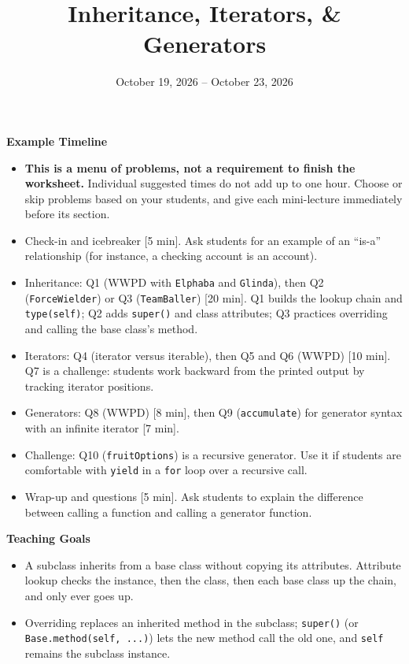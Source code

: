 \documentclass{exam}
\title{Inheritance, Iterators, \& Generators}
\date{October 19, 2026 -- October 23, 2026}
\begin{document}
\maketitle

\begin{meta}
\small
\textbf{Example Timeline}
\begin{itemize}
    \item \textbf{This is a menu of problems, not a requirement to finish the worksheet.} Individual suggested times do not add up to one hour. Choose or skip problems based on your students, and give each mini-lecture immediately before its section.
    \item Check-in and icebreaker [5 min]. Ask students for an example of an ``is-a'' relationship (for instance, a checking account is an account).
    \item Inheritance: Q1 (WWPD with \lstinline{Elphaba} and \lstinline{Glinda}), then Q2 (\lstinline{ForceWielder}) or Q3 (\lstinline{TeamBaller}) [20 min]. Q1 builds the lookup chain and \lstinline{type(self)}; Q2 adds \lstinline{super()} and class attributes; Q3 practices overriding and calling the base class's method.
    \item Iterators: Q4 (iterator versus iterable), then Q5 and Q6 (WWPD) [10 min]. Q7 is a challenge: students work backward from the printed output by tracking iterator positions.
    \item Generators: Q8 (WWPD) [8 min], then Q9 (\lstinline{accumulate}) for generator syntax with an infinite iterator [7 min].
    \item Challenge: Q10 (\lstinline{fruitOptions}) is a recursive generator. Use it if students are comfortable with \lstinline{yield} in a \lstinline{for} loop over a recursive call.
    \item Wrap-up and questions [5 min]. Ask students to explain the difference between calling a function and calling a generator function.
\end{itemize}
\textbf{Teaching Goals}
\begin{itemize}
    \item A subclass inherits from a base class without copying its attributes. Attribute lookup checks the instance, then the class, then each base class up the chain, and only ever goes up.
    \item Overriding replaces an inherited method in the subclass; \lstinline{super()} (or \lstinline{Base.method(self, ...)}) lets the new method call the old one, and \lstinline{self} remains the subclass instance.

\end{itemize}
\end{meta}
\end{document}

